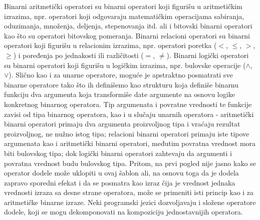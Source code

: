 Binarni aritmetički operatori su binarni operatori koji figurišu u aritmetičkim izrazima, npr. operatori koji odgovaraju matematičkim operacijama sabiranja, oduzimanja, množenja, deljenja, stepenovanja itd. ali i bitovski binarni operatori kao što su operatori bitovskog pomeranja. Binarni relacioni operatori su binarni operatori koji figurišu u relacionim izrazima, npr. operatori poretka ($<$, $\leq$, $>$, $\geq$) i poređenja po jednakosti ili različitosti ($=$, $\neq$). Binarni logički operatori su binarni operatori koji figurišu u logičkim izrazima, npr. bulovske operacije ($\wedge$, $\vee$). Slično kao i za unarne operatore, moguće je apstraktno posmatrati sve binarne operatore tako što ih definišemo kao strukturu koja definiše binarnu funkciju dva argumenta koja transformiše date argumente na osnovu logike konkretnog binarnog operatora. Tip argumenata i povratne vrednosti te funkcije zavisi od tipa binarnog operatora, kao i u slučaju unarnih operatora - aritmetički binarni operatori primaju dva argumenta proizvoljnog tipa i vraćaju rezultat proizvoljnog, ne nužno istog tipa; relacioni binarni operatori primaju iste tipove argumenata kao i aritmetički binarni operatori, međutim povratna vrednost mora biti bulovskog tipa; dok logički binarni operatori zahtevaju da argumenti i povratna vrednost budu bulovskog tipa. Pritom, na prvi pogled nije jasno kako se operator dodele može uklopiti u ovaj šablon ali, na osnovu toga da je dodela zapravo sporedni efekat i da se posmatra kao izraz čija je vrednost jednaka vrednosti izraza sa desne strane operatora, može se primeniti isti princip kao i za aritmetičke binarne izraze. Neki programski jezici dozvoljavaju i složene operatore dodele, koji se mogu dekomponovati na kompoziciju jednostavnijih operatora.

